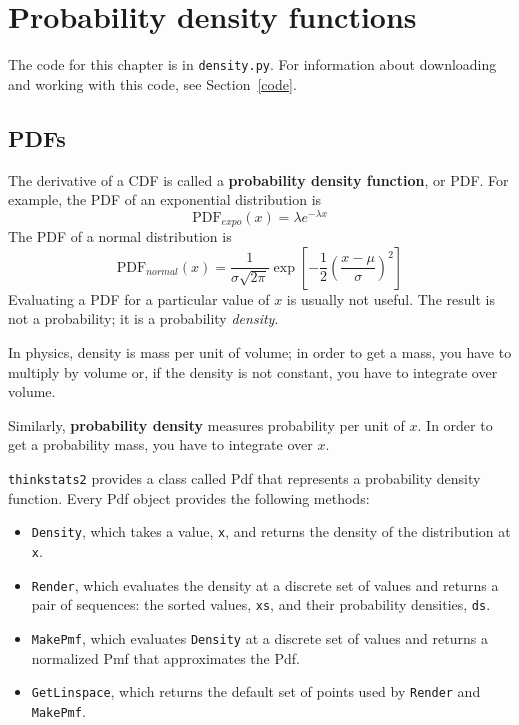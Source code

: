 \documentclass[12pt]{book}
\newcommand{\PDF}{\mathrm{PDF}}
\theoremstyle{exercise}
\begin{document}
\chapter{Probability density functions}%
\label{density}%
%
%
%
%
%
%
%
%
%

The code for this chapter is in {\tt density.py}.  For information
about downloading and working with this code, see Section~\ref{code}.


\section{PDFs}

The derivative of a CDF is called a {\bf probability density function},
or PDF.  For example, the PDF of an exponential distribution is
%
\[ \PDF_{expo}(x) = \lambda e^{-\lambda x}   \]
%
The PDF of a normal distribution is
%
\[ \PDF_{normal}(x) = \frac{1}{\sigma \sqrt{2 \pi}} 
                 \exp \left[ -\frac{1}{2} 
                 \left( \frac{x - \mu}{\sigma} \right)^2 \right]  \]
%
Evaluating a PDF for a particular value of $x$ is usually not useful.
The result is not a probability; it is a probability {\em density}.%
%

In physics, density is mass per unit of
volume; in order to get a mass, you have to multiply by volume or,
if the density is not constant, you have to integrate over volume.

Similarly, {\bf probability density} measures probability per unit of $x$.
In order to get a probability mass, you have to integrate over $x$.

{\tt thinkstats2} provides a class called Pdf that represents
a probability density function.  Every Pdf object provides the
following methods:

\begin{itemize}

\item {\tt Density}, which takes a value, {\tt x}, and returns the
  density of the distribution at {\tt x}.

\item {\tt Render}, which evaluates the density at a discrete set of
  values and returns a pair of sequences: the sorted values, {\tt xs},
  and their probability densities, {\tt ds}.

\item {\tt MakePmf}, which evaluates {\tt Density}
  at a discrete set of values and returns a normalized Pmf that
  approximates the Pdf.%

\item {\tt GetLinspace}, which returns the default set of points used 
  by {\tt Render} and {\tt MakePmf}.

\end{itemize}  
\end{document}
